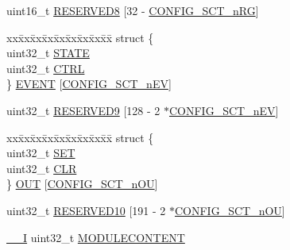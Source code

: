 \begin{DoxyCompactItemize}
\begin{tabbing}
\end{tabbing}\item 
uint16\+\_\+t \hyperlink{struct_l_p_c___s_c_t___t_ab5fc6d0781201cd3b0039c598bf54577}{R\+E\+S\+E\+R\+V\+E\+D8} \mbox{[}32 -\/ \hyperlink{group___s_c_t__18_x_x__43_x_x_ga8d80e251208a01483a6b00c81ecb7493}{C\+O\+N\+F\+I\+G\+\_\+\+S\+C\+T\+\_\+n\+RG}\mbox{]}
\item 
\begin{tabbing}
xx\=xx\=xx\=xx\=xx\=xx\=xx\=xx\=xx\=\kill
struct \{\\
\>uint32\_t \hyperlink{struct_l_p_c___s_c_t___t_abeacb1097562ec8b30de5ab2050d86cb}{STATE}\\
\>uint32\_t \hyperlink{struct_l_p_c___s_c_t___t_a9fa4dcb17ebe609cf881c6103875863f}{CTRL}\\
\} \hyperlink{struct_l_p_c___s_c_t___t_a4f0ab5507fc386f7d9bbcd7e45b38b05}{EVENT} \mbox{[}\hyperlink{group___s_c_t__18_x_x__43_x_x_ga2672a9e7fb27a28b4f2dd7f4468f0010}{CONFIG\_SCT\_nEV}\mbox{]}\\

\end{tabbing}\item 
uint32\+\_\+t \hyperlink{struct_l_p_c___s_c_t___t_ac692eef84990f45e43aa8b6e18f3b4ee}{R\+E\+S\+E\+R\+V\+E\+D9} \mbox{[}128 -\/ 2 $\ast$\hyperlink{group___s_c_t__18_x_x__43_x_x_ga2672a9e7fb27a28b4f2dd7f4468f0010}{C\+O\+N\+F\+I\+G\+\_\+\+S\+C\+T\+\_\+n\+EV}\mbox{]}
\item 
\begin{tabbing}
xx\=xx\=xx\=xx\=xx\=xx\=xx\=xx\=xx\=\kill
struct \{\\
\>uint32\_t \hyperlink{struct_l_p_c___s_c_t___t_a07ed32424a74047af889489a0160ad69}{SET}\\
\>uint32\_t \hyperlink{struct_l_p_c___s_c_t___t_a68f907ea063e2e53e77a943f23514b3a}{CLR}\\
\} \hyperlink{struct_l_p_c___s_c_t___t_af9d6f1a21fe1141f29295c43a66bf08c}{OUT} \mbox{[}\hyperlink{group___s_c_t__18_x_x__43_x_x_gab432d85ccb09a5c5d232916c8bb95089}{CONFIG\_SCT\_nOU}\mbox{]}\\

\end{tabbing}\item 
uint32\+\_\+t \hyperlink{struct_l_p_c___s_c_t___t_aef9a465a0430680c8237fae017d3e405}{R\+E\+S\+E\+R\+V\+E\+D10} \mbox{[}191 -\/ 2 $\ast$\hyperlink{group___s_c_t__18_x_x__43_x_x_gab432d85ccb09a5c5d232916c8bb95089}{C\+O\+N\+F\+I\+G\+\_\+\+S\+C\+T\+\_\+n\+OU}\mbox{]}
\item 
\hyperlink{core__sc300_8h_af63697ed9952cc71e1225efe205f6cd3}{\+\_\+\+\_\+I} uint32\+\_\+t \hyperlink{struct_l_p_c___s_c_t___t_a77e94a24f92f46235780c2a52d9b524d}{M\+O\+D\+U\+L\+E\+C\+O\+N\+T\+E\+NT}
\end{DoxyCompactItemize}


